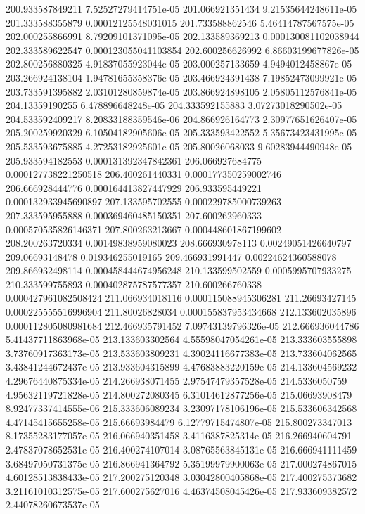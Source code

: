 {200.933587849211 7.52527279414751e-05
201.066921351434 9.21535644248611e-05
201.333588355879 0.00012125548031015
201.733588862546 5.46414787567575e-05
202.000255866991 8.79209101371095e-05
202.133589369213 0.000130081102038944
202.333589622547 0.000123055041103854
202.600256626992 6.86603199677826e-05
202.800256880325 4.91837055923044e-05
203.000257133659 4.9494012458867e-05
203.266924138104 1.94781655358376e-05
203.466924391438 7.19852473099921e-05
203.733591395882 2.03101280859874e-05
203.866924898105 2.05805112576841e-05
204.13359190255 6.478896648248e-05
204.333592155883 3.07273018290502e-05
204.533592409217 8.20833188359546e-06
204.866926164773 2.30977651626407e-05
205.200259920329 6.10504182905606e-05
205.333593422552 5.35673423431995e-05
205.533593675885 4.27253182925601e-05
205.80026068033 9.60283944490948e-05
205.933594182553 0.000131392347842361
206.066927684775 0.000127738221250518
206.400261440331 0.000177350259002746
206.666928444776 0.000164413827447929
206.933595449221 0.000132933945690897
207.133595702555 0.000229785000739263
207.333595955888 0.000369460485150351
207.600262960333 0.000570535826146371
207.800263213667 0.000448601867199602
208.200263720334 0.00149838959080023
208.666930978113 0.00249051426640797
209.06693148478 0.019346255019165
209.466931991447 0.00224624360588078
209.866932498114 0.000458444674956248
210.133599502559 0.0005995707933275
210.333599755893 0.000402875787577357
210.600266760338 0.000427961082508424
211.066934018116 0.000115088945306281
211.26693427145 0.000225555516996904
211.80026828034 0.000155837953434668
212.133602035896 0.000112805080981684
212.466935791452 7.09743139796326e-05
212.666936044786 5.41437711863968e-05
213.133603302564 4.55598047054261e-05
213.333603555898 3.73760917363173e-05
213.533603809231 4.39024116677383e-05
213.733604062565 3.43841244672437e-05
213.933604315899 4.47683883220159e-05
214.133604569232 4.29676440875334e-05
214.266938071455 2.97547479357528e-05
214.5336050759 4.95632119721828e-05
214.800272080345 6.31014612877256e-05
215.06693908479 8.92477337414555e-06
215.333606089234 3.23097178106196e-05
215.533606342568 4.47145415655258e-05
215.66693984479 6.12779715474807e-05
215.800273347013 8.17355283177057e-05
216.066940351458 3.4116387825314e-05
216.266940604791 2.47837078652531e-05
216.400274107014 3.08765563845131e-05
216.666941111459 3.68497050731375e-05
216.866941364792 5.35199979900063e-05
217.000274867015 4.60128513838433e-05
217.200275120348 3.03042800405868e-05
217.400275373682 3.21161010312575e-05
217.600275627016 4.46374508045426e-05
217.933609382572 2.44078260673537e-05
}
